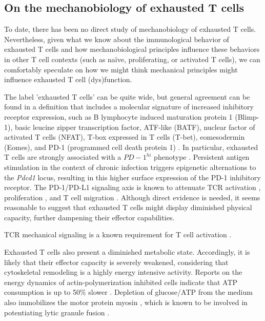 \subsection{On the mechanobiology of exhausted T cells}

To date, there has been no direct study of mechanobiology of exhausted T cells. Nevertheless, given what we know about the immunological behavior of exhausted T cells and how mechanobiological principles influence these behaviors in other T cell contexts (such as na{\"i}ve, proliferating, or activated T cells), we can comfortably speculate on how we might think mechanical principles might influence exhausted T cell (dys)function.

The label 'exhausted T cells' can be quite wide, but general agreement can be found in a definition that includes a molecular signature of increased inhibitory receptor expression, such as B lymphocyte induced maturation protein 1 (Blimp-1), basic leucine zipper transcription factor, ATF-like (BATF), nuclear factor of activated T cells (NFAT), T-box expressed in T cells (T-bet), eomesodermin (Eomes), and PD-1 (programmed cell death protein 1) \cite{Wherry2011, Quigley2010, Keir2008, Doering2012, Wherry2007, Wang2012,  Lazarevic2013, Rangachari2012, Shin2009, Paley2012, Larsson2013}. In particular, exhausted T cells are strongly associated with a $PD-1^{hi}$ phenotype \cite{Keir2008}. Persistent antigen stimulation in the context of chronic infection triggers epigenetic alternations to the \textit{Pdcd1} locus, resulting in this higher surface expression of the PD-1 inhibitory receptor. The PD-1/PD-L1 signaling axis is known to attenuate TCR activation \cite{Mizuno2019}, proliferation \cite{Schietinger2014}, and T cell migration \cite{Zinselmeyer2013}. Although direct evidence is needed, it seems reasonable to suggest that exhausted T cells might display diminished physical capacity, further dampening their effector capabilities.

TCR mechanical signaling is a known requirement for T cell activation \cite{Hu2016}.

Exhausted T cells also present a diminished metabolic state. Accordingly, it is likely that their effector capacity is severely weakened, considering that cytoskeletal remodeling is a highly energy intensive activity. Reports on the energy dynamics of actin-polymerization inhibited cells indicate that ATP consumption is up to 50\% slower \cite{Bernstein2002, Ahmed2015}. Depletion of glucose/ATP from the medium also immobilizes the motor protein myosin \cite{Xu2014}, which is known to be involved in potentiating lytic granule fusion \cite{Basu2016}.

